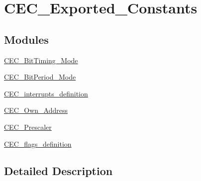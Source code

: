 \hypertarget{group___c_e_c___exported___constants}{}\section{C\+E\+C\+\_\+\+Exported\+\_\+\+Constants}
\label{group___c_e_c___exported___constants}
\subsection*{Modules}
\begin{DoxyCompactItemize}
\item 
\hyperlink{group___c_e_c___bit_timing___mode}{C\+E\+C\+\_\+\+Bit\+Timing\+\_\+\+Mode}
\item 
\hyperlink{group___c_e_c___bit_period___mode}{C\+E\+C\+\_\+\+Bit\+Period\+\_\+\+Mode}
\item 
\hyperlink{group___c_e_c__interrupts__definition}{C\+E\+C\+\_\+interrupts\+\_\+definition}
\item 
\hyperlink{group___c_e_c___own___address}{C\+E\+C\+\_\+\+Own\+\_\+\+Address}
\item 
\hyperlink{group___c_e_c___prescaler}{C\+E\+C\+\_\+\+Prescaler}
\item 
\hyperlink{group___c_e_c__flags__definition}{C\+E\+C\+\_\+flags\+\_\+definition}
\end{DoxyCompactItemize}


\subsection{Detailed Description}
